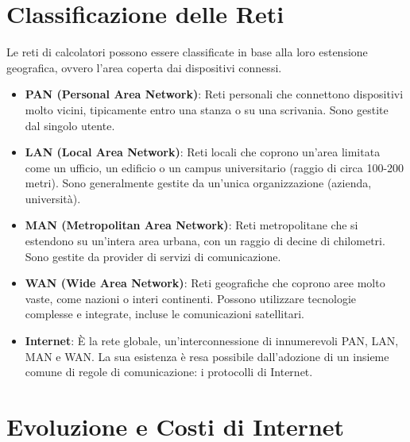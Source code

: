 
\section{Classificazione delle Reti}

Le reti di calcolatori possono essere classificate in base alla loro estensione geografica, ovvero l'area coperta dai dispositivi connessi.
\begin{itemize}
    \item \textbf{PAN (Personal Area Network)}: Reti personali che connettono dispositivi molto vicini, tipicamente entro una stanza o su una scrivania. Sono gestite dal singolo utente.
    \item \textbf{LAN (Local Area Network)}: Reti locali che coprono un'area limitata come un ufficio, un edificio o un campus universitario (raggio di circa 100-200 metri). Sono generalmente gestite da un'unica organizzazione (azienda, università).
    \item \textbf{MAN (Metropolitan Area Network)}: Reti metropolitane che si estendono su un'intera area urbana, con un raggio di decine di chilometri. Sono gestite da provider di servizi di comunicazione.
    \item \textbf{WAN (Wide Area Network)}: Reti geografiche che coprono aree molto vaste, come nazioni o interi continenti. Possono utilizzare tecnologie complesse e integrate, incluse le comunicazioni satellitari.
    \item \textbf{Internet}: È la rete globale, un'interconnessione di innumerevoli PAN, LAN, MAN e WAN. La sua esistenza è resa possibile dall'adozione di un insieme comune di regole di comunicazione: i protocolli di Internet.
\end{itemize}

\section{Evoluzione e Costi di Internet}

